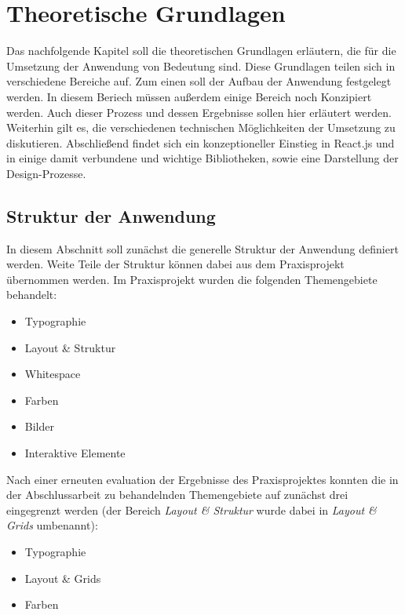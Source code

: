 \chapter{Theoretische Grundlagen}
\thispagestyle{fancy}
Das nachfolgende Kapitel soll die theoretischen Grundlagen erläutern, die für die Umsetzung der Anwendung von Bedeutung sind. Diese Grundlagen teilen sich in verschiedene Bereiche auf. Zum einen soll der Aufbau der Anwendung festgelegt werden. In diesem Beriech müssen außerdem einige Bereich noch Konzipiert werden. Auch dieser Prozess und dessen Ergebnisse sollen hier erläutert werden.
Weiterhin gilt es, die verschiedenen technischen Möglichkeiten der Umsetzung zu diskutieren. Abschließend findet sich ein konzeptioneller Einstieg in React.js und in einige damit verbundene und wichtige Bibliotheken, sowie eine Darstellung der Design-Prozesse.

\section{Struktur der Anwendung}
In diesem Abschnitt soll zunächst die generelle Struktur der Anwendung definiert werden. Weite Teile der Struktur können dabei aus dem Praxisprojekt übernommen werden. Im Praxisprojekt wurden die folgenden Themengebiete behandelt:

\begin{itemize}
  \item Typographie
  \item Layout \& Struktur
  \item Whitespace
  \item Farben
  \item Bilder
  \item Interaktive Elemente
\end{itemize}

Nach einer erneuten evaluation der Ergebnisse des Praxisprojektes konnten die in der Abschlussarbeit zu behandelnden Themengebiete auf zunächst drei eingegrenzt werden (der Bereich \textit{Layout \& Struktur} wurde dabei in \textit{Layout \& Grids} umbenannt):

\begin{itemize}
  \item Typographie
  \item Layout \& Grids
  \item Farben
\end{itemize}

